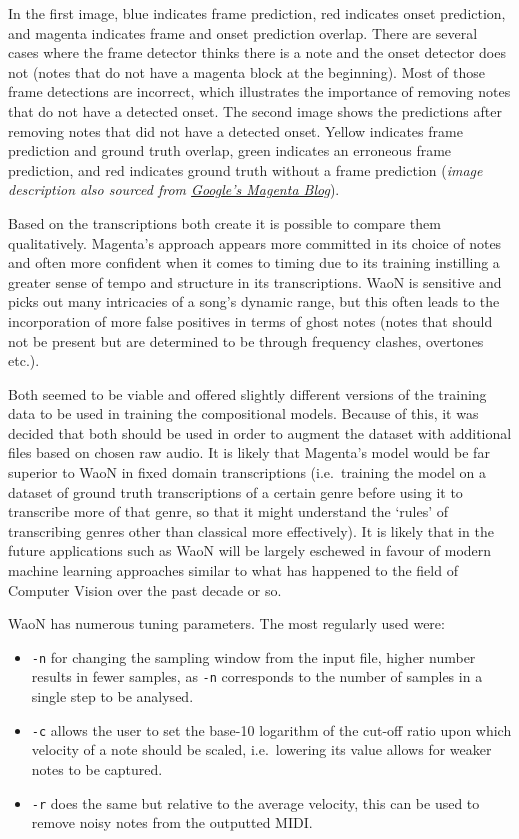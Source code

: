 \documentclass[12pt,]{article}
\providecommand{\tightlist}{%
  \setlength{\itemsep}{0pt}\setlength{\parskip}{0pt}}
\begin{document}
In the first image, blue indicates frame prediction, red indicates onset
prediction, and magenta indicates frame and onset prediction overlap.
There are several cases where the frame detector thinks there is a note
and the onset detector does not (notes that do not have a magenta block
at the beginning). Most of those frame detections are incorrect, which
illustrates the importance of removing notes that do not have a detected
onset. The second image shows the predictions after removing notes that
did not have a detected onset. Yellow indicates frame prediction and
ground truth overlap, green indicates an erroneous frame prediction, and
red indicates ground truth without a frame prediction
(\textit{image description also sourced from \href{https://magenta.tensorflow.org/onsets-frames}{Google's Magenta Blog}}).

Based on the transcriptions both create it is possible to compare them
qualitatively. Magenta's approach appears more committed in its choice
of notes and often more confident when it comes to timing due to its
training instilling a greater sense of tempo and structure in its
transcriptions. WaoN is sensitive and picks out many intricacies of a
song's dynamic range, but this often leads to the incorporation of more
false positives in terms of ghost notes (notes that should not be
present but are determined to be through frequency clashes, overtones
etc.).

Both seemed to be viable and offered slightly different versions of the
training data to be used in training the compositional models. Because
of this, it was decided that both should be used in order to augment the
dataset with additional files based on chosen raw audio. It is likely
that Magenta's model would be far superior to WaoN in fixed domain
transcriptions (i.e.~training the model on a dataset of ground truth
transcriptions of a certain genre before using it to transcribe more of
that genre, so that it might understand the `rules' of transcribing
genres other than classical more effectively). It is likely that in the
future applications such as WaoN will be largely eschewed in favour of
modern machine learning approaches similar to what has happened to the
field of Computer Vision over the past decade or so.

WaoN has numerous tuning parameters. The most regularly used were:

\begin{itemize}
\tightlist
\item
  \texttt{-n} for changing the sampling window from the input file,
  higher number results in fewer samples, as \texttt{-n} corresponds to
  the number of samples in a single step to be analysed.
\item
  \texttt{-c} allows the user to set the base-10 logarithm of the
  cut-off ratio upon which velocity of a note should be scaled,
  i.e.~lowering its value allows for weaker notes to be captured.
\item
  \texttt{-r} does the same but relative to the average velocity, this
  can be used to remove noisy notes from the outputted MIDI.
\end{itemize}
\end{document}
